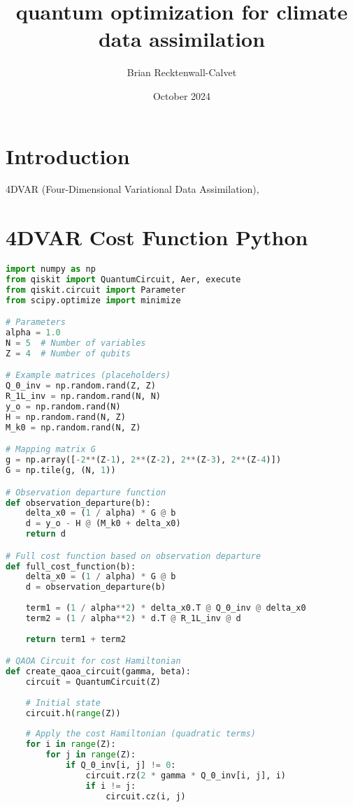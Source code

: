 \documentclass{article}
\title{quantum optimization for climate data assimilation}
\author{Brian Recktenwall-Calvet}
\date{October 2024}
\begin{document}
\maketitle

\section{Introduction}

4DVAR (Four-Dimensional Variational Data Assimilation), 


\section{4DVAR Cost Function Python}
\begin{lstlisting}[language=Python]
import numpy as np
from qiskit import QuantumCircuit, Aer, execute
from qiskit.circuit import Parameter
from scipy.optimize import minimize

# Parameters
alpha = 1.0
N = 5  # Number of variables
Z = 4  # Number of qubits

# Example matrices (placeholders)
Q_0_inv = np.random.rand(Z, Z)
R_1L_inv = np.random.rand(N, N)
y_o = np.random.rand(N)
H = np.random.rand(N, Z)
M_k0 = np.random.rand(N, Z)

# Mapping matrix G
g = np.array([-2**(Z-1), 2**(Z-2), 2**(Z-3), 2**(Z-4)])
G = np.tile(g, (N, 1))

# Observation departure function
def observation_departure(b):
    delta_x0 = (1 / alpha) * G @ b
    d = y_o - H @ (M_k0 + delta_x0)
    return d

# Full cost function based on observation departure
def full_cost_function(b):
    delta_x0 = (1 / alpha) * G @ b
    d = observation_departure(b)
    
    term1 = (1 / alpha**2) * delta_x0.T @ Q_0_inv @ delta_x0
    term2 = (1 / alpha**2) * d.T @ R_1L_inv @ d
    
    return term1 + term2

# QAOA Circuit for cost Hamiltonian
def create_qaoa_circuit(gamma, beta):
    circuit = QuantumCircuit(Z)
    
    # Initial state
    circuit.h(range(Z))
    
    # Apply the cost Hamiltonian (quadratic terms)
    for i in range(Z):
        for j in range(Z):
            if Q_0_inv[i, j] != 0:
                circuit.rz(2 * gamma * Q_0_inv[i, j], i)
                if i != j:
                    circuit.cz(i, j)


\end{lstlisting}
\end{document}
